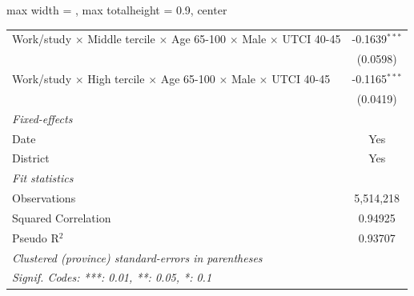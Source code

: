 \begin{table}[htbp]
\begin{adjustbox}{max width = \textwidth, max totalheight = 0.9\textheight, center}
\begin{tabular}{lc}
         Work/study $\times$ Middle tercile $\times$ Age 65-100 $\times$ Male $\times$ UTCI 40-45       & -0.1639$^{***}$\\   
                                                                                                        & (0.0598)\\   
         Work/study $\times$ High tercile $\times$ Age 65-100 $\times$ Male $\times$ UTCI 40-45         & -0.1165$^{***}$\\   
                                                                                                        & (0.0419)\\   
         \midrule
         \emph{Fixed-effects}\\
         Date                                                                                           & Yes\\  
         District                                                                                       & Yes\\  
         \midrule
         \emph{Fit statistics}\\
         Observations                                                                                   & 5,514,218\\  
         Squared Correlation                                                                            & 0.94925\\  
         Pseudo R$^2$                                                                                   & 0.93707\\  
         \midrule \midrule
         \multicolumn{2}{l}{\emph{Clustered (province) standard-errors in parentheses}}\\
         \multicolumn{2}{l}{\emph{Signif. Codes: ***: 0.01, **: 0.05, *: 0.1}}\\
      \end{tabular}
   \end{adjustbox}
\end{table}


